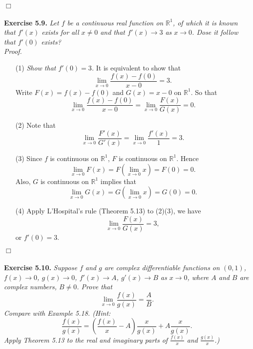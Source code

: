 \documentclass{article}
\begin{document}
$\Box$ \\\\






\textbf{Exercise 5.9.}
\emph{Let $f$ be a continuous real function on $\mathbb{R}^1$,
of which it is known that $f'(x)$ exists for all $x \neq 0$ and that $f'(x) \to 3$ as $x \to 0$.
Dose it follow that $f'(0)$ exists?} \\

\emph{Proof.}
\begin{enumerate}
  \item[(1)]
  \emph{Show that $f'(0) = 3$.}
  It is equivalent to show that
  \[
    \lim_{x \to 0} \frac{f(x) - f(0)}{x - 0} = 3.
  \]
  Write $F(x) = f(x) - f(0)$ and $G(x) = x - 0$ on $\mathbb{R}^1$.
  So that
  \[
    \lim_{x \to 0} \frac{f(x) - f(0)}{x - 0} = \lim_{x \to 0} \frac{F(x)}{G(x)} = 0.
  \]

  \item[(2)]
  Note that
    \[
      \lim_{x \to 0} \frac{F'(x)}{G'(x)}
      = \lim_{x \to 0} \frac{f'(x)}{1}
      = 3.
    \]

  \item[(3)]
  Since $f$ is continuous on $\mathbb{R}^1$,
  $F$ is continuous on $\mathbb{R}^1$.
  Hence
    \[
      \lim_{x \to 0} F(x) = F(\lim_{x \to 0} x) = F(0) = 0.
    \]
  Also, $G$ is continuous on $\mathbb{R}^1$ implies that
    \[
      \lim_{x \to 0} G(x) = G(\lim_{x \to 0} x) = G(0) = 0.
    \]

  \item[(4)]
  Apply L'Hospital's rule (Theorem 5.13) to (2)(3), we have
  \[
    \lim_{x \to 0} \frac{F(x)}{G(x)} = 3,
  \]
  or $f'(0) = 3$.
\end{enumerate}
$\Box$ \\\\






\textbf{Exercise 5.10.}
\emph{Suppose $f$ and $g$ are complex differentiable functions on $(0,1)$,
$f(x) \to 0$, $g(x) \to 0$, $f'(x) \to A$, $g'(x) \to B$ as $x \to 0$,
where $A$ and $B$ are complex numbers, $B \neq 0$.
Prove that
\[
  \lim_{x \to 0}{\frac{f(x)}{g(x)}}= \frac{A}{B}.
\]
Compare with Example 5.18.
(Hint:
\[
  \frac{f(x)}{g(x)}
  = \left( \frac{f(x)}{x} - A \right) \frac{x}{g(x)} +  A\frac{x}{g(x)}.
\]
Apply Theorem 5.13 to
the real and imaginary parts of $\frac{f(x)}{x}$ and $\frac{g(x)}{x}$.)} \\
\end{document}
